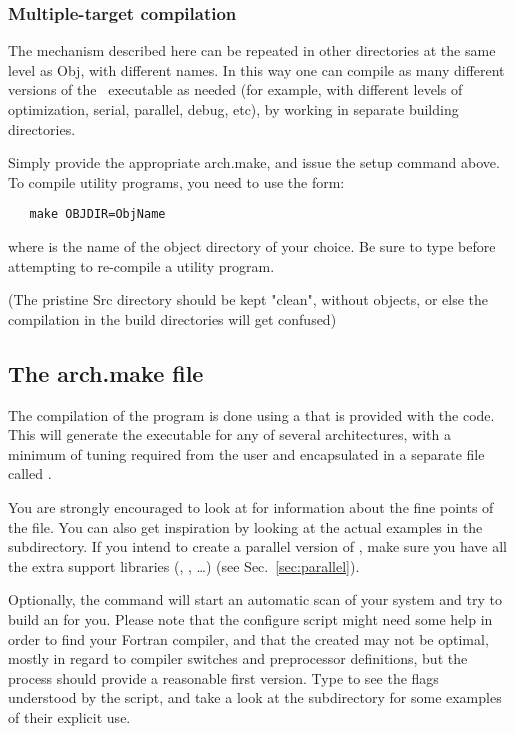 \subsubsection{Multiple-target compilation}

The mechanism described here can be repeated in other directories at
the same level as Obj, with different names. In this way one can
compile as many different versions of the \siesta\ executable as
needed (for example, with different levels of optimization, serial,
parallel, debug, etc), by working in separate building directories.

Simply provide the appropriate arch.make, and issue the setup command
above. To compile utility programs, you need to use the form:

\begin{verbatim}
   make OBJDIR=ObjName
\end{verbatim}

where  is the name of the object directory of your
choice. Be sure to type  before attempting to
re-compile a utility program.

(The pristine Src directory should be kept "clean", without objects, or else
the compilation in the build directories will get confused)


\subsection{The arch.make file}
\label{sec:arch-make}

The compilation of the program is done using a  that is
provided with the code. This  will
generate the executable for any of several architectures, with a
minimum of tuning required from the user and encapsulated in a
separate file called .

You are strongly encouraged to look at
 for information about the
fine points of the  file. You can also get
inspiration by looking at the actual  examples in
the  subdirectory. If you intend to create a parallel
version of \siesta, make sure you have all the extra support libraries
(, , \dots) (see Sec.~\ref{sec:parallel}).
  
Optionally, the command  will start an
automatic scan of your system and try to build an 
for you. Please note that the configure script might need some help in
order to find your Fortran compiler, and that the created
 may not be optimal, mostly in regard to compiler
switches and preprocessor definitions, but the process should provide
a reasonable first version. Type  to
see the flags understood by the script, and take a look at the
 subdirectory for some examples of their explicit
use. 



